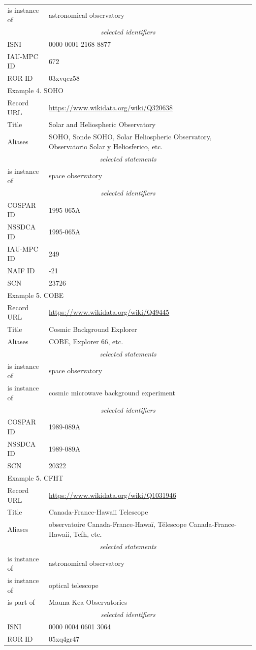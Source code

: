 \documentclass[11pt,a4paper]{ivoa}
\begin{document}
\begin{longtable}{p{}p{}}
is instance of & astronomical observatory \\
\multicolumn{2}{c}{\sl selected identifiers}\\
ISNI       & 0000 0001 2168 8877\\
IAU-MPC ID & 672\\
ROR ID     & 03xvqcz58\\
\hline
\hline
\multicolumn{2}{l}{Example 4. SOHO}\\
\hline
Record URL & \url{https://www.wikidata.org/wiki/Q320638}\\
Title      & Solar and Heliospheric Observatory\\
Aliases    & SOHO, Sonde SOHO, Solar Heliospheric Observatory, Observatorio Solar y Heliosferico, etc.\\
\multicolumn{2}{c}{\sl selected statements}\\
is instance of & space observatory \\
\multicolumn{2}{c}{\sl selected identifiers}\\
COSPAR ID  & 1995-065A \\
NSSDCA ID  & 1995-065A \\
IAU-MPC ID & 249\\
NAIF ID    & -21\\
SCN        & 23726\\
\hline
\hline
\multicolumn{2}{l}{Example 5. COBE}\\
\hline
Record URL & \url{https://www.wikidata.org/wiki/Q49445}\\
Title      & Cosmic Background Explorer\\
Aliases    & COBE, Explorer 66, etc.\\
\multicolumn{2}{c}{\sl selected statements}\\
is instance of & space observatory \\
is instance of & cosmic microwave background experiment \\
\multicolumn{2}{c}{\sl selected identifiers}\\
COSPAR ID  & 1989-089A \\
NSSDCA ID  & 1989-089A \\
SCN        & 20322\\
\hline
\hline
\multicolumn{2}{l}{Example 5. CFHT}\\
\hline
Record URL & \url{https://www.wikidata.org/wiki/Q1031946}\\
Title      & Canada-France-Hawaii Telescope\\
Aliases    & observatoire Canada-France-Hawa\"i, T\'elescope Canada-France-Hawaii, Tcfh, etc.\\
\multicolumn{2}{c}{\sl selected statements}\\
is instance of & astronomical observatory \\
is instance of & optical telescope \\
is part of & Mauna Kea Observatories\\
\multicolumn{2}{c}{\sl selected identifiers}\\
ISNI       & 0000 0004 0601 3064\\
ROR ID     & 05xq4gr47 \\
\hline
\end{longtable}
\end{document}
